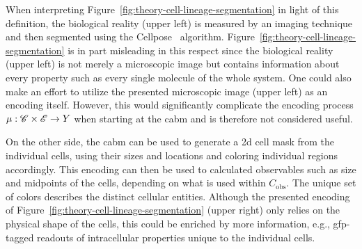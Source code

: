 When interpreting Figure~\ref{fig:theory-cell-lineage-segmentation} in light of this definition, the
biological reality (upper left) is measured by an imaging technique and then segmented using the
Cellpose~\cite{Stringer2020} algorithm.
Figure~\ref{fig:theory-cell-lineage-segmentation} is in part misleading in this respect since the
biological reality (upper left) is not merely a microscopic image but contains information about
every property such as every single molecule of the whole system.
One could also make an effort to utilize the presented microscopic image (upper left) as an encoding
itself.
However, this would significantly complicate the encoding process $\mu:\mathscr{C}\times\mathscr{E}\rightarrow Y$
when starting at the \ac{cabm} and is therefore not considered useful.

On the other side, the \ac{cabm} can be used to generate a \ac{2d} cell mask from the individual
cells, using their sizes and locations and coloring individual regions accordingly.
This encoding can then be used to calculated observables such as size and midpoints of the cells,
depending on what is used within $C_\text{obs}$.
The unique set of colors describes the distinct cellular entities.
Although the presented encoding of Figure~\ref{fig:theory-cell-lineage-segmentation} (upper right)
only relies on the physical shape of the cells, this could be enriched by more information, e.g.,
\ac{gfp}-tagged readouts of intracellular properties unique to the individual cells.

